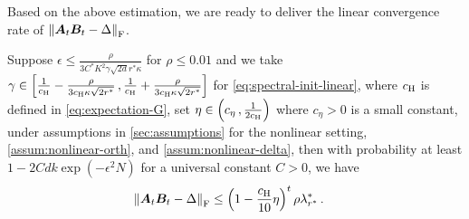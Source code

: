 Based on the above estimation, we are ready to deliver the linear convergence rate of $\left\|\bm A_{t}\bm B_{t} - \Delta\right\|_{\rm F}$.
\begin{theorem}\label{LC}
    Suppose $\epsilon \leq \frac{\rho}{3C^*K^2\gamma\sqrt{2d}r^*\kappa}$ for $\rho\leq 0.01$ and we take $\gamma\in\left[\frac{1}{c_{\rm H}}-\frac{\rho}{3c_{\rm H}\kappa\sqrt{2r^*}}\,,\frac{1}{c_{\rm H}}+\frac{\rho}{3c_{\rm H}\kappa\sqrt{2r^*}}\right]$ for \eqref{eq:spectral-init-linear}, where $c_{\rm H}$ is defined in \cref{eq:expectation-G}, set $\eta \in \left(c_{\eta}\,,\frac{1}{2c_{\rm H}}\right)$ where $c_{\eta}>0$ is a small constant, under assumptions in \cref{sec:assumptions} for the nonlinear setting, \cref{assum:nonlinear-orth}, and \cref{assum:nonlinear-delta}, then with probability at least $1-2Cdk\operatorname{exp}\left(-\epsilon^2 N\right)$ for a universal constant $C>0$, we have
    \begin{align*}
            \left\|\bm A_{t}\bm B_{t} - \Delta\right\|_{\rm F} & \leq \left(1-\frac{c_{\rm H}}{10}\eta\right)^t \rho\lambda^*_{r^*}\,.
        \end{align*}
\end{theorem}
